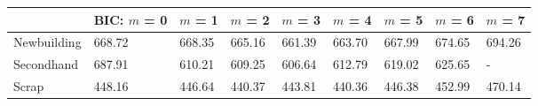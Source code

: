 
\begin{tabular}[t]{lllllllll}
\toprule
  & BIC: $m$ = 0 & $m$ = 1 & $m$ = 2 & $m$ = 3 & $m$ = 4 & $m$ = 5 & $m$ = 6 & $m$ = 7\\
\midrule
Newbuilding & 668.72 & 668.35 & 665.16 & 661.39 & 663.70 & 667.99 & 674.65 & 694.26\\
Secondhand & 687.91 & 610.21 & 609.25 & 606.64 & 612.79 & 619.02 & 625.65 & -\\
Scrap & 448.16 & 446.64 & 440.37 & 443.81 & 440.36 & 446.38 & 452.99 & 470.14\\
\bottomrule
\end{tabular}
